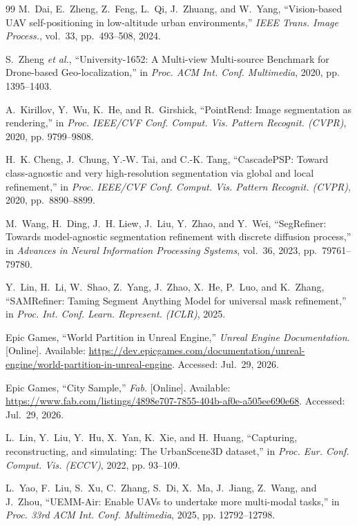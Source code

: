 \documentclass[letterpaper,journal]{IEEEtran}
\begin{document}
\begin{thebibliography}{99}
M.~Dai, E.~Zheng, Z.~Feng, L.~Qi, J.~Zhuang, and W.~Yang, ``Vision-based UAV self-positioning in low-altitude urban environments,'' \textit{IEEE Trans. Image Process.}, vol.~33, pp.~493--508, 2024.

S.~Zheng \textit{et al.}, ``University-1652: A Multi-view Multi-source Benchmark for Drone-based Geo-localization,'' in \textit{Proc. ACM Int. Conf. Multimedia}, 2020, pp. 1395--1403.

A.~Kirillov, Y.~Wu, K.~He, and R.~Girshick, ``PointRend: Image segmentation as rendering,'' in \textit{Proc. IEEE/CVF Conf. Comput. Vis. Pattern Recognit. (CVPR)}, 2020, pp. 9799--9808.

H.~K. Cheng, J.~Chung, Y.-W. Tai, and C.-K. Tang, ``CascadePSP: Toward class-agnostic and very high-resolution segmentation via global and local refinement,'' in \textit{Proc. IEEE/CVF Conf. Comput. Vis. Pattern Recognit. (CVPR)}, 2020, pp.~8890--8899.

M.~Wang, H.~Ding, J.~H. Liew, J.~Liu, Y.~Zhao, and Y.~Wei, ``SegRefiner: Towards model-agnostic segmentation refinement with discrete diffusion process,'' in \textit{Advances in Neural Information Processing Systems}, vol.~36, 2023, pp.~79761--79780.

Y.~Lin, H.~Li, W.~Shao, Z.~Yang, J.~Zhao, X.~He, P.~Luo, and K.~Zhang, ``SAMRefiner: Taming Segment Anything Model for universal mask refinement,'' in \textit{Proc. Int. Conf. Learn. Represent. (ICLR)}, 2025.

Epic Games, ``World Partition in Unreal Engine,'' \textit{Unreal Engine Documentation}. [Online]. Available: \url{https://dev.epicgames.com/documentation/unreal-engine/world-partition-in-unreal-engine}. Accessed: Jul.~29, 2026.

Epic Games, ``City Sample,'' \textit{Fab}. [Online]. Available: \url{https://www.fab.com/listings/4898e707-7855-404b-af0e-a505ee690e68}. Accessed: Jul.~29, 2026.

L.~Lin, Y.~Liu, Y.~Hu, X.~Yan, K.~Xie, and H.~Huang, ``Capturing, reconstructing, and simulating: The UrbanScene3D dataset,'' in \textit{Proc. Eur. Conf. Comput. Vis. (ECCV)}, 2022, pp. 93--109.

L.~Yao, F.~Liu, S.~Xu, C.~Zhang, S.~Di, X.~Ma, J.~Jiang, Z.~Wang, and J.~Zhou, ``UEMM-Air: Enable UAVs to undertake more multi-modal tasks,'' in \textit{Proc. 33rd ACM Int. Conf. Multimedia}, 2025, pp. 12792--12798.


\end{thebibliography}
\end{document}
